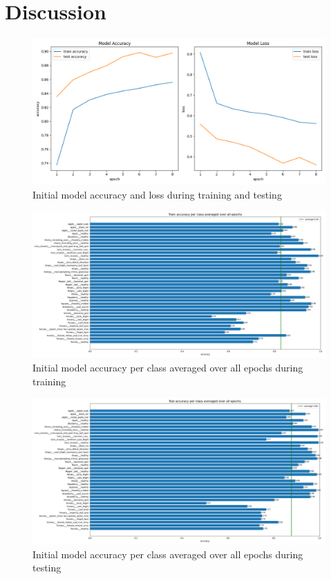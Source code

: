 \documentclass{BachelorBUI}
\begin{document}
\section{Discussion}
    \begin{figure}[h]
        \centering
        \includegraphics[width=\textwidth]{initial_accuracy_and_loss_2024-11-25_07.55.35.png}
        \caption{\centering Initial model accuracy and loss during training and testing}
        \label{fig:initial-accuracy-and-loss}
    \end{figure}
    \begin{figure}[h]
        \centering
        \includegraphics[width=\textwidth]{initial_train_accuracy_per_class_2024-11-25_07.55.35.png}
        \caption{\centering Initial model accuracy per class averaged over all epochs during training}
        \label{fig:initial-train-accuracy-per-class}
    \end{figure}
    \begin{figure}[h]
        \centering
        \includegraphics[width=\textwidth]{initial_test_accuracy_per_class_2024-11-25_07.55.35.png}
        \caption{\centering Initial model accuracy per class averaged over all epochs during testing}
        \label{fig:initial-test-accuracy-per-class}
    \end{figure}
\end{document}

